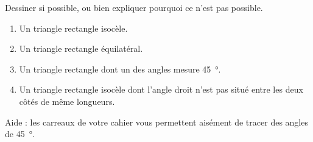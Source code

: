 
\begin{exercice}\label{exo2smath-0261}

    Dessiner si possible, ou bien expliquer pourquoi ce n'est pas possible.
    \begin{enumerate}
        \item
            Un triangle rectangle isocèle.
        \item
            Un triangle rectangle équilatéral.
        \item
            Un triangle rectangle dont un des angles mesure \SI{45}{\degree}.
        \item
            Un triangle rectangle isocèle dont l'angle droit n'est pas situé entre les deux côtés de même longueurs.
    \end{enumerate}
    Aide : les carreaux de votre cahier vous permettent aisément de tracer des angles de \SI{45}{\degree}.

\end{exercice}
